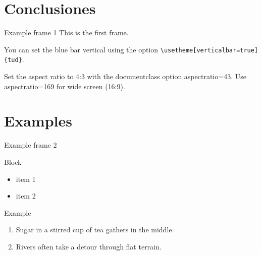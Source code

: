 \documentclass[aspectratio=43]{beamer}
\renewcommand{\cite}[1]{\footnote<.->[frame]{\fullcite{#1}}}
\begin{document}
\section{Conclusiones}


\begin{frame}[fragile]{Example frame 1} %
This is the first frame.

You can set the blue bar vertical using the option \verb|\usetheme[verticalbar=true]{tud}|.

Set the aspect ratio to 4:3 with the
documentclass option aspectratio=43. Use aspectratio=169 for wide screen (16:9).
\end{frame}

\section{Examples}
\begin{frame}{Example frame 2}
  \begin{block}{Block}
    \begin{itemize}
      \item item 1
      \item item 2
    \end{itemize}
  \end{block}

  \begin{exampleblock}{Example}
    \begin{enumerate}
      \item Sugar in a stirred cup of tea gathers in the middle.
      \item Rivers often take a detour through flat terrain.
    \end{enumerate}
  \end{exampleblock}

\end{frame}

	
	
	
\end{document}
